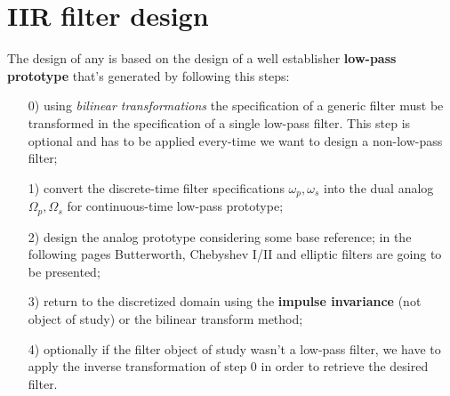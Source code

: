 \section{IIR filter design}
	The design of any  is based on the design of a well establisher \textbf{low-pass prototype} that's generated by following this steps:
	\begin{itemize}
		\item[0)] using \textit{bilinear transformations} the specification of a generic filter must be transformed in the specification of a single low-pass filter. This step is optional and has to be applied every-time we want to design a non-low-pass filter;		
		\item[1)] convert the discrete-time filter specifications $\omega_p,\omega_s$ into the dual analog $\Omega_p,\Omega_s$ for  continuous-time low-pass prototype;
		\item[2)] design the analog prototype considering some base reference; in the following pages Butterworth, Chebyshev I/II and elliptic filters are going to be presented;
		\item[3)] return to the discretized domain using the \textbf{impulse invariance} (not object of study) or the bilinear transform method;
		\item[4)] optionally if the filter object of study wasn't a low-pass filter, we have to apply the inverse transformation of step 0 in order to retrieve the desired filter.
	\end{itemize}
	
